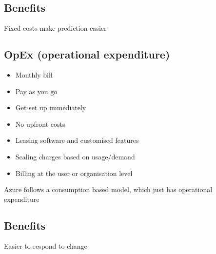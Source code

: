 \documentclass{article}[18pt]
\begin{document}
\subsection{Benefits}
Fixed costs make prediction easier

\subsection{OpEx (operational expenditure)}

\begin{itemize}
	\tightlist
	\item
	Monthly bill
	\item
	Pay as you go
	\item
	Get set up immediately
	\item
	No upfront costs
	\item
	Leasing software and customised features
	\item
	Scaling charges based on usage/demand
	\item
	Billing at the user or organisation level
\end{itemize}

Azure follows a consumption based model, which just has operational
expenditure
\subsection{Benefits}
Easier to respond to change
\end{document}
